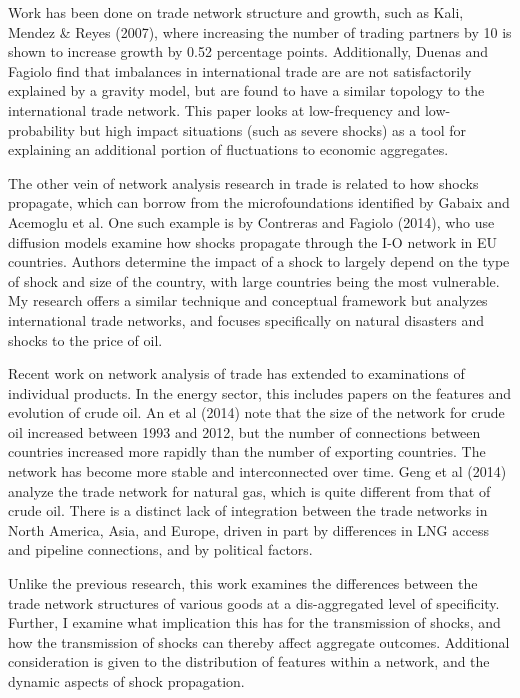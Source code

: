 \documentclass[10pt,letterpaper]{article}
\begin{document}
Work has been done on trade network structure and growth, such as Kali, Mendez \& Reyes (2007), where increasing the number of trading partners by 10 is shown to increase growth by 0.52 percentage points. Additionally, Duenas and Fagiolo find that imbalances in international trade are are not satisfactorily explained by a gravity model, but are found to have a similar topology to the international trade network. This paper looks at low-frequency and low-probability but high impact situations (such as severe shocks) as a tool for explaining an additional portion of fluctuations to economic aggregates.

The other vein of network analysis research in trade is related to how shocks propagate, which can borrow from the microfoundations identified by Gabaix and Acemoglu et al. One such example is by Contreras and Fagiolo (2014), who use diffusion models examine how shocks propagate through the I-O network in EU countries. Authors determine the impact of a shock to largely depend on the type of shock and size of the country, with large countries being the most vulnerable. My research offers a similar technique and conceptual framework but analyzes international trade networks, and focuses specifically on natural disasters and shocks to the price of oil.

Recent work on network analysis of trade has extended to examinations of individual products. In the energy sector, this includes papers on the features and evolution of crude oil. An et al (2014) note that the size of the network for crude oil increased between 1993 and 2012, but the number of connections between countries increased more rapidly than the number of exporting countries. The network has become more stable and interconnected over time. Geng et al (2014) analyze the trade network for natural gas, which is quite different from that of crude oil. There is a distinct lack of integration between the trade networks in North America, Asia, and Europe, driven in part by differences in LNG access and pipeline connections, and by political factors.  

Unlike the previous research, this work examines the differences between the trade network structures of various goods at a dis-aggregated level of specificity. Further, I examine what implication this has for the transmission of shocks, and how the transmission of shocks can thereby affect aggregate outcomes. Additional consideration is given to the distribution of features within a network, and the dynamic aspects of shock propagation.
\end{document}
